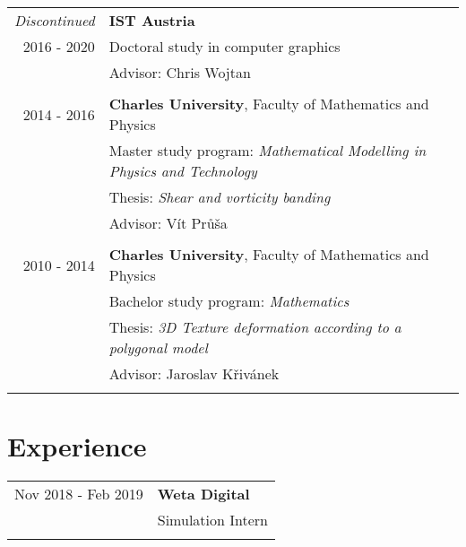 \documentclass[a4paper,10pt]{article} %
\begin{document}
\begin{tabular}{rl}
  
  \emph{Discontinued} & \textbf{IST Austria}\\
  2016 - 2020    & Doctoral study in computer graphics \\
                 & Advisor: Chris Wojtan \\
                 &\\

  
  2014 - 2016 & \textbf{Charles University}, Faculty of Mathematics and Physics \\
                 & Master study program: \emph{Mathematical Modelling in Physics and Technology} \\
                 & Thesis: \emph{Shear and vorticity banding} \\
                 & Advisor: Vít Průša \\
                 &\\
  

  2010 - 2014 & \textbf{Charles University}, Faculty of Mathematics and Physics \\
                 & Bachelor study program: \emph{Mathematics} \\
                 & Thesis: \emph{3D Texture deformation according to a polygonal model} \\
                 & Advisor: Jaroslav Křivánek \\
                 &\\

\end{tabular}


\section{Experience}

\begin{tabular}{rl}
  
  Nov 2018 - Feb 2019 & \textbf{Weta Digital} \\
                      & Simulation Intern \\
                      &\\
  
\end{tabular}
\end{document}
